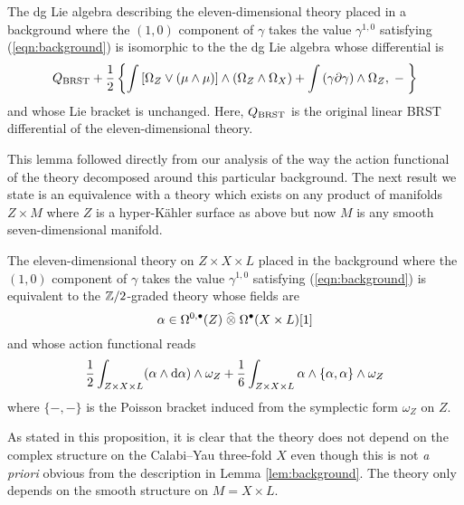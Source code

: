 \documentclass[11pt]{amsart}
\begin{document}
\begin{lem} \label{lem:background}
  The dg Lie algebra describing the eleven-dimensional theory placed in a background where the $(1,0)$ component of $\gamma$ takes the value $\gamma^{1,0}$ satisfying (\ref{eqn:background}) is isomorphic to the the dg Lie algebra whose differential is
  \begin{equation}\label{eqn:newdiff}
    Q_{\rm BRST} + \frac{1}{2} \left\{ \int \left[\Omega_Z \vee (\mu \wedge \mu) \right] \wedge (\Omega_Z \wedge \Omega_X) + \int \left(\gamma \partial \gamma\right) \wedge \Omega_Z , \; - \; \right\}
  \end{equation}
  and whose Lie bracket is unchanged.
  Here, $Q_{\rm BRST}$ is the original linear BRST differential of the eleven-dimensional theory.
\end{lem}

This lemma followed directly from our analysis of the way the action functional of the theory decomposed around this particular background.
The next result we state is an equivalence with a theory which exists on any product of manifolds $Z \times M$ where $Z$ is a hyper-K\"{a}hler surface as above but now $M$ is any smooth seven-dimensional manifold.


\begin{prop}
  The eleven-dimensional theory on $Z \times X \times L$ placed in the background where the $(1,0)$ component of $\gamma$ takes the value $\gamma^{1,0}$ satisfying (\ref{eqn:background}) is equivalent to the $\mathbb Z/2$-graded theory whose fields are
\[
\alpha \in \Omega^{0,\bullet}(Z) \; \widehat{\otimes} \; \Omega^\bullet(X \times L) [1]
\]
  and whose action functional reads
  \[
    \frac12 \int_{Z \times X \times L} (\alpha \wedge {\rm d}\alpha) \wedge \omega_Z  + \frac16 \int_{Z\times X \times L} \alpha \wedge \{\alpha, \alpha\} \wedge \omega_Z
  \]
  where $\{-,-\}$ is the Poisson bracket induced from the symplectic form $\omega_Z$ on $Z$. 
\end{prop}

As stated in this proposition, it is clear that the theory does not depend on the complex structure on the Calabi--Yau three-fold $X$ even though this is not {\em a priori} obvious from the description in Lemma \ref{lem:background}. 
The theory only depends on the smooth structure on $M = X \times L$.
\end{document}
